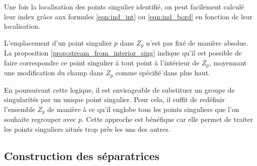 Une fois la localisation des points singulier identifié, on peut facilement calculé leur index grâce aux formules \ref{eqn:ind_int} ou \ref{eqn:ind_bord} en fonction de leur localisation.

\begin{remark}
L'emplacement d'un point singulier $p$ dans $Z_p$ n'est pas fixé de manière absolue. La proposition \ref{prop:stream_from_interior_sing} indique qu'il est possible de faire correspondre ce point singulier à tout point à l'intérieur de $Z_p$, moyennant une modification du champ dans $Z_p$ comme spécifié dans plus haut.

En poursuivant cette logique, il est envisageable de substituer un groupe de singularités par un unique point singulier. Pour cela, il suffit de redéfinir l'ensemble $Z_p$ de manière à ce qu'il englobe tous les points singuliers que l'on souhaite regrouper avec $p$. Cette approche est bénéfique car elle permet de traiter les points singuliers situés trop près les uns des autres.
\end{remark}

\subsection{Construction des séparatrices}

